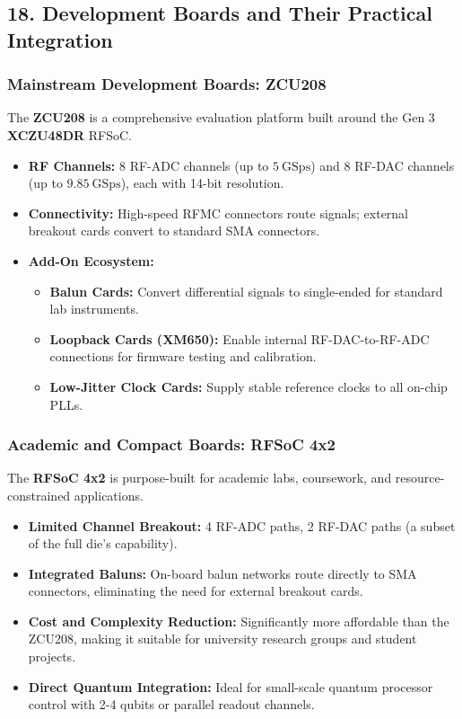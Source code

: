 \documentclass[
]{article}
\providecommand{\tightlist}{%
  \setlength{\itemsep}{0pt}\setlength{\parskip}{0pt}}
\begin{document}
\subsection{18. Development Boards and Their Practical
Integration}\label{development-boards-and-their-practical-integration}

\subsubsection{Mainstream Development Boards:
ZCU208}\label{mainstream-development-boards-zcu208}

The \textbf{ZCU208} is a comprehensive evaluation platform built around
the Gen 3 \textbf{XCZU48DR} RFSoC.

\begin{itemize}
\tightlist
\item
  \textbf{RF Channels:} 8 RF-ADC channels (up to \(5\ \text{GSps}\)) and
  8 RF-DAC channels (up to \(9.85\ \text{GSps}\)), each with 14-bit
  resolution.
\item
  \textbf{Connectivity:} High-speed RFMC connectors route signals;
  external breakout cards convert to standard SMA connectors.
\item
  \textbf{Add-On Ecosystem:}

  \begin{itemize}
  \tightlist
  \item
    \textbf{Balun Cards:} Convert differential signals to single-ended
    for standard lab instruments.
  \item
    \textbf{Loopback Cards (XM650):} Enable internal RF-DAC-to-RF-ADC
    connections for firmware testing and calibration.
  \item
    \textbf{Low-Jitter Clock Cards:} Supply stable reference clocks to
    all on-chip PLLs.
  \end{itemize}
\end{itemize}

\subsubsection{Academic and Compact Boards: RFSoC
4x2}\label{academic-and-compact-boards-rfsoc-4x2}

The \textbf{RFSoC 4x2} is purpose-built for academic labs, coursework,
and resource-constrained applications.

\begin{itemize}
\tightlist
\item
  \textbf{Limited Channel Breakout:} 4 RF-ADC paths, 2 RF-DAC paths (a
  subset of the full die's capability).
\item
  \textbf{Integrated Baluns:} On-board balun networks route directly to
  SMA connectors, eliminating the need for external breakout cards.
\item
  \textbf{Cost and Complexity Reduction:} Significantly more affordable
  than the ZCU208, making it suitable for university research groups and
  student projects.
\item
  \textbf{Direct Quantum Integration:} Ideal for small-scale quantum
  processor control with 2-4 qubits or parallel readout channels.
\end{itemize}
\end{document}
